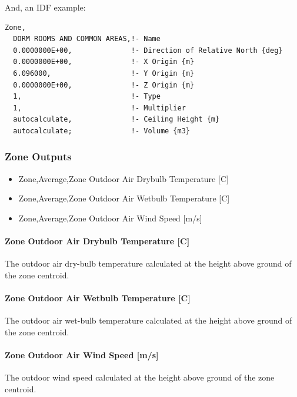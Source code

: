 And, an IDF example:

\begin{lstlisting}
Zone,
  DORM ROOMS AND COMMON AREAS,!- Name
  0.0000000E+00,              !- Direction of Relative North {deg}
  0.0000000E+00,              !- X Origin {m}
  6.096000,                   !- Y Origin {m}
  0.0000000E+00,              !- Z Origin {m}
  1,                          !- Type
  1,                          !- Multiplier
  autocalculate,              !- Ceiling Height {m}
  autocalculate;              !- Volume {m3}
\end{lstlisting}

\subsubsection{Zone Outputs}\label{outputs-037}

\begin{itemize}
\item
  Zone,Average,Zone Outdoor Air Drybulb Temperature {[}C{]}
\item
  Zone,Average,Zone Outdoor Air Wetbulb Temperature {[}C{]}
\item
  Zone,Average,Zone Outdoor Air Wind Speed {[}m/s{]}
\end{itemize}

\paragraph{Zone Outdoor Air Drybulb Temperature {[}C{]}}\label{zone-outdoor-air-drybulb-temperature-c-000}

The outdoor air dry-bulb temperature calculated at the height above ground of the zone centroid.

\paragraph{Zone Outdoor Air Wetbulb Temperature {[}C{]}}\label{zone-outdoor-air-wetbulb-temperature-c-000}

The outdoor air wet-bulb temperature calculated at the height above ground of the zone centroid.

\paragraph{Zone Outdoor Air Wind Speed {[}m/s{]}}\label{zone-outdoor-air-wind-speed-ms-000}

The outdoor wind speed calculated at the height above ground of the zone centroid.

